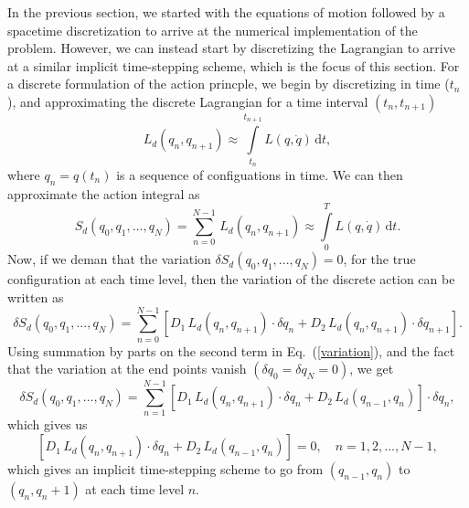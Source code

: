 \documentclass[nofootinbib,preprintnumbers,superscriptaddress,notitlepage]{revtex4-1}
\newcommand{\<}{\begin{equation}}
\newcommand{\?}{\end{equation}}
\begin{document}
In the previous section, we started with the equations of motion followed by a
spacetime discretization to arrive at the numerical implementation of the
problem. However, we can instead start by discretizing the Lagrangian to
arrive at a similar implicit time-stepping scheme, which is the focus of this
section. For a discrete formulation of the action princple, we begin by
discretizing in time ($t_n$), and approximating the discrete Lagrangian for a
time interval $(t_n, t_{n+1})$
\begin{equation}
\label{discretized_lagrangian}
L_d(q_{n}, q_{n+1}) \approx \int\limits_{t_n}^{t_{n+1}} L(q, \dot{q})\, \textrm{d}t,
\end{equation}
where $q_n = q(t_n)$ is a sequence of configuations in time. We can then
approximate the action integral as
\begin{equation}
S_d(q_0, q_1, ..., q_N) = \sum\limits_{n=0}^{N-1} \,L_d (q_n, q_{n+1})
\approx \int\limits_{0}^{T} L(q, \dot{q})\, \textrm{d}t.
\end{equation}
Now, if we deman that the variation $\delta S_d(q_0, q_1, ..., q_N) = 0$, for
the true configuration at each time level, then the variation of the discrete
action can be written as
\begin{equation}
\label{variation}
\delta S_d(q_0, q_1, ..., q_N) = \sum\limits_{n=0}^{N-1} \left[D_1 \,L_d (q_n, q_{n+1})\cdot \delta q_n 
+ D_2\,L_d (q_n, q_{n+1})\cdot \delta q_{n+1}\right].
\end{equation}
Using summation by parts on the second term in Eq.~(\ref{variation}), and the
fact that the variation at the end points vanish $(\delta q_0 = \delta q_N = 0)$,
we get
\begin{equation}
\delta S_d(q_0, q_1, ..., q_N) = \sum\limits_{n=1}^{N-1}  \left[ D_1 \,L_d (q_{n}, q_{n+1})\cdot \delta q_n 
+ D_2\,L_d (q_{n-1}, q_{n}) \right] \cdot \delta q_{n},
\end{equation}
which gives us
\begin{equation}
\label{finalform_variational}
 \left[ D_1 \,L_d (q_{n}, q_{n+1})\cdot \delta q_n 
+ D_2\,L_d (q_{n-1}, q_{n}) \right] = 0, \quad n = 1, 2,...,N-1,
\end{equation}
which gives an implicit time-stepping scheme to go from $(q_{n-1}, q_n)$ to $(q_n, q_n+1)$ at each time level $n$. \\
\end{document}
